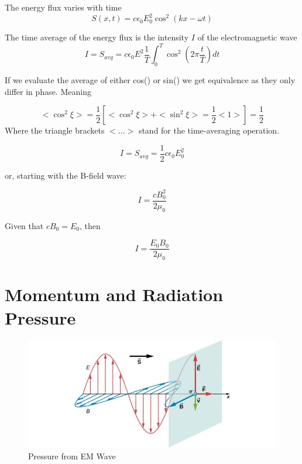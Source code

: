 \documentclass[14pt]{memoir}
\begin{document}
The energy flux varies with time
\begin{equation}
S(x,t) = c \epsilon_0 E_0^2 \cos^2{(kx-\omega t)}
\end{equation}

The time average of the energy flux is the intensity $I$ of the electromagnetic wave
\begin{equation}
I = S_{avg} = c \epsilon_0 E^2 \frac{1}{T} \int_0^T \cos^2{(2 \pi \frac{t}{T})} dt
\end{equation}

If we evaluate the average of either cos() or sin() we get equivalence as they only differ in phase. Meaning

\begin{equation}
< \cos^2{\xi} > = \frac{1}{2} [< \cos^2{\xi} > + < \sin^2{\xi} >= \frac{1}{2} <1>] = \frac{1}{2}
\end{equation}
Where the triangle brackets $<...>$ stand for the time-averaging operation.

\begin{equation}
I = S_{avg} = \frac{1}{2} c \epsilon_0 E_0^2
\end{equation}

or, starting with the B-field wave:

\begin{equation}
I = \frac{c B_0^2}{2 \mu_0}
\end{equation}

Given that $c B_0 = E_0$, then

\begin{equation}
I = \frac{E_0 B_0}{2 \mu_0}
\end{equation}

\section{Momentum and Radiation Pressure}

\begin{figure}[H]
\begin{center}
\includegraphics[scale=0.5]{fig/fig_16_13.jpg}
\caption{Pressure from EM Wave}
\label{fig:16_13}
\end{center}
\end{figure}
\end{document}

